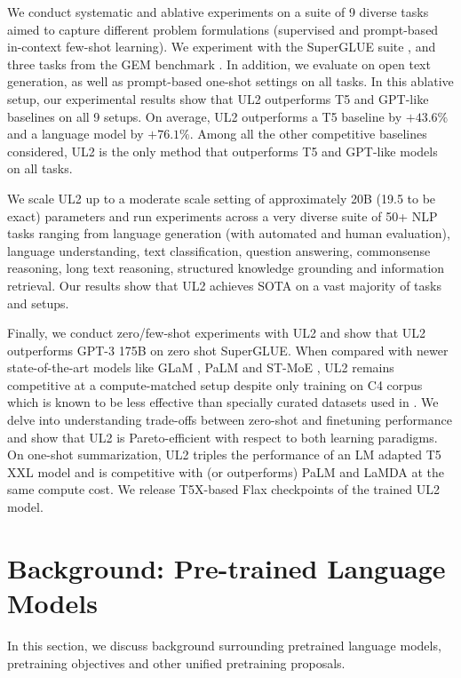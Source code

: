 \documentclass[10pt]{article}
\begin{document}
We conduct systematic and ablative experiments on a suite of 9 diverse tasks aimed to capture different problem formulations (supervised and prompt-based in-context few-shot learning). We experiment with the SuperGLUE suite \citep{wang2019superglue}, and three tasks from the GEM benchmark \citep{gehrmann2021gem}. In addition, we evaluate on open text generation, as well as prompt-based one-shot settings on all tasks. In this ablative setup, our experimental results show that UL2 outperforms T5 and GPT-like baselines on all 9 setups. On average, UL2 outperforms a T5 baseline by $+43.6\%$ and a language model by $+76.1\%$. Among all the other competitive baselines considered, UL2 is the only method that outperforms T5 and GPT-like models on all tasks. 

We scale UL2 up to a moderate scale setting of approximately 20B (19.5 to be exact) parameters and run experiments across a very diverse suite of 50+ NLP tasks ranging from language generation (with automated and human evaluation), language understanding, text classification, question answering, commonsense reasoning, long text reasoning, structured knowledge grounding and information retrieval. Our results show that UL2 achieves SOTA on a vast majority of tasks and setups. 

Finally, we conduct zero/few-shot experiments with UL2 and show that UL2 outperforms GPT-3 175B on zero shot SuperGLUE. When compared with newer state-of-the-art models like GLaM \citep{du2021glam}, PaLM \citep{chowdhery2022palm} and ST-MoE \citep{zoph2022designing}, UL2 remains competitive at a compute-matched setup despite only training on C4 corpus which is known to be less effective than specially curated datasets used in \citep{du2021glam,chowdhery2022palm}. We delve into understanding trade-offs between zero-shot and finetuning performance and show that UL2 is Pareto-efficient with respect to both learning paradigms. On one-shot summarization, UL2 triples the performance of an LM adapted T5 XXL model and is competitive with (or outperforms) PaLM and LaMDA at the same compute cost. We release T5X-based Flax checkpoints of the trained UL2 model.  
\newpage

\section{Background: Pre-trained Language Models}
In this section, we discuss background surrounding pretrained language models, pretraining objectives and other unified pretraining proposals.
\end{document}
